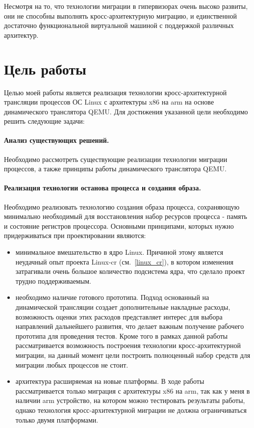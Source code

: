 Несмотря на то, что технологии миграции в гипервизорах очень высоко развиты, они не способны выполнять кросс-архитектурную миграцию, и единственной достаточно функциональной виртуальной машиной с поддержкой различных архитектур.

\section{Цель работы}\label{aims}

Целью моей работы является реализация технологии кросс-архитектурной трансляции процессов ОС Linux с архитектуры x86 на arm на основе динамического транслятора QEMU. Для достижения указанной цели необходимо решить следующие задачи:

\paragraph{Анализ существующих решений.}

Необходимо рассмотреть существующие реализации технологии миграции процессов, а также принципы работы динамического транслятора QEMU.

\paragraph{Реализация технологии останова процесса и создания образа.}

Необходимо реализовать технологию создания образа процесса, сохраняющую минимально необходимый для восстановления набор ресурсов процесса - память и состояние регистров процессора. Основными принципами, которых нужно придерживаться при проектировании являются:

\begin{itemize}

    \item минимальное вмешательство в ядро Linux. Причиной этому является неудачный опыт проекта Linux-cr (см.~\ref{linux_cr}), в котором изменения затрагивали очень большое количество подсистема ядра, что сделало проект трудно поддерживаемым.

    \item необходимо наличие готового прототипа. Подход основанный на динамической трансляции создает дополнительные накладные расходы, возможность оценки этих расходов представляет интерес для выбора направлений дальнейшего развития, что делает важным получение рабочего прототипа для проведения тестов. Кроме того в рамках данной работы рассматривается возможность построения технологии кросс-архитектурной миграции, на данный момент цели построить полноценный набор средств для миграции любых процессов не стоит.

    \item архитектура расширяемая на новые платформы. В ходе работы рассматривается только миграция с архитектуры x86 на arm, так как у меня в наличии arm устройство, на котором можно тестировать результаты работы, однако технология кросс-архитектурной миграции не должна ограничиваться только двумя платформами.

\end{itemize}

